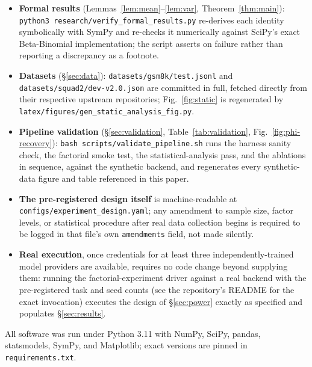 \documentclass[journal]{IEEEtran}
\begin{document}
\begin{itemize}
\item \textbf{Formal results} (Lemmas~\ref{lem:mean}--\ref{lem:var}, Theorem~\ref{thm:main}): \texttt{python3 research/verify\_formal\_results.py} re-derives each identity symbolically with SymPy and re-checks it numerically against SciPy's exact Beta-Binomial implementation; the script asserts on failure rather than reporting a discrepancy as a footnote.
\item \textbf{Datasets} (\S\ref{sec:data}): \texttt{datasets/gsm8k/test.jsonl} and \texttt{datasets/squad2/dev-v2.0.json} are committed in full, fetched directly from their respective upstream repositories; Fig.~\ref{fig:static} is regenerated by \texttt{latex/figures/gen\_static\_analysis\_fig.py}.
\item \textbf{Pipeline validation} (\S\ref{sec:validation}, Table~\ref{tab:validation}, Fig.~\ref{fig:phi-recovery}): \texttt{bash scripts/validate\_pipeline.sh} runs the harness sanity check, the factorial smoke test, the statistical-analysis pass, and the ablations in sequence, against the synthetic backend, and regenerates every synthetic-data figure and table referenced in this paper.
\item \textbf{The pre-registered design itself} is machine-readable at \texttt{configs/experiment\_design.yaml}; any amendment to sample size, factor levels, or statistical procedure after real data collection begins is required to be logged in that file's own \texttt{amendments} field, not made silently.
\item \textbf{Real execution}, once credentials for at least three independently-trained model providers are available, requires no code change beyond supplying them: running the factorial-experiment driver against a real backend with the pre-registered task and seed counts (see the repository's README for the exact invocation) executes the design of \S\ref{sec:power} exactly as specified and populates \S\ref{sec:results}.
\end{itemize}

All software was run under Python 3.11 with NumPy, SciPy, pandas, statsmodels, SymPy, and Matplotlib; exact versions are pinned in \texttt{requirements.txt}.
\end{document}
